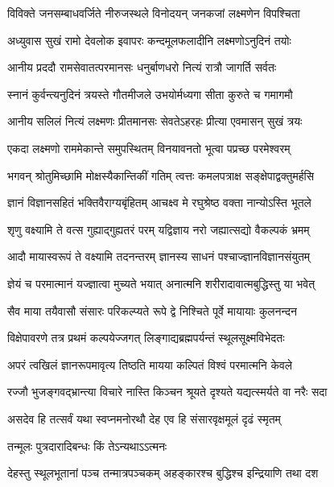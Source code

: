 \twolineshloka
{विविक्ते जनसम्बाधवर्जिते नीरुजस्थले}
{विनोदयन् जनकजां लक्ष्मणेन विपश्चिता} %

\twolineshloka
{अध्युवास सुखं रामो देवलोक इवापरः}
{कन्दमूलफलादीनि लक्ष्मणोऽनुदिनं तयोः} %

\twolineshloka
{आनीय प्रददौ रामसेवातत्परमानसः}
{धनुर्बाणधरो नित्यं रात्रौ जागर्ति सर्वतः} %

\twolineshloka
{स्नानं कुर्वन्त्यनुदिनं त्रयस्ते गौतमीजले}
{उभयोर्मध्यगा सीता कुरुते च गमागमौ} %

\twolineshloka
{आनीय सलिलं नित्यं लक्ष्मणः प्रीतमानसः}
{सेवतेऽहरहः प्रीत्या एवमासन् सुखं त्रयः} %

\twolineshloka
{एकदा लक्ष्मणो राममेकान्ते समुपस्थितम्}
{विनयावनतो भूत्वा पप्रच्छ परमेश्वरम्} %

\twolineshloka
{भगवन् श्रोतुमिच्छामि मोक्षस्यैकान्तिकीं गतिम्}
{त्वत्तः कमलपत्राक्ष सङ्क्षेपाद्वक्तुमर्हसि} %

\twolineshloka
{ज्ञानं विज्ञानसहितं भक्तिवैराग्यबृंहितम्}
{आचक्ष्व मे रघुश्रेष्ठ वक्ता नान्योऽस्ति भूतले} %


\twolineshloka
{शृणु वक्ष्यामि ते वत्स गुह्याद्गुह्यतरं परम्}
{यद्विज्ञाय नरो जह्यात्सद्यो वैकल्पकं भ्रमम्} %

\twolineshloka
{आदौ मायास्वरूपं ते वक्ष्यामि तदनन्तरम्}
{ज्ञानस्य साधनं पश्चाज्ज्ञानविज्ञानसंयुतम्} %

\twolineshloka
{ज्ञेयं च परमात्मानं यज्ज्ञात्वा मुच्यते भयात्}
{अनात्मनि शरीरादावात्मबुद्धिस्तु या भवेत्} %

\twolineshloka
{सैव माया तयैवासौ संसारः परिकल्प्यते}
{रूपे द्वे निश्चिते पूर्वे मायायाः कुलनन्दन} %

\twolineshloka
{विक्षेपावरणे तत्र प्रथमं कल्पयेज्जगत्}
{लिङ्गाद्यब्रह्मपर्यन्तं स्थूलसूक्ष्मविभेदतः} %

\twolineshloka
{अपरं त्वखिलं ज्ञानरूपमावृत्य तिष्ठति}
{मायया कल्पितं विश्वं परमात्मनि केवले} %

\twolineshloka
{रज्जौ भुजङ्गवद्भ्रान्त्या विचारे नास्ति किञ्चन}
{श्रूयते दृश्यते यद्यत्स्मर्यते वा नरैः सदा} %

\twolineshloka
{असदेव हि तत्सर्वं यथा स्वप्नमनोरथौ}
{देह एव हि संसारवृक्षमूलं दृढं स्मृतम्} %

\onelineshloka
{तन्मूलः पुत्रदारादिबन्धः किं तेऽन्यथाऽऽत्मनः} %


\twolineshloka
{देहस्तु स्थूलभूतानां पञ्च तन्मात्रपञ्चकम्}
{अहङ्कारश्च बुद्धिश्च इन्द्रियाणि तथा दश} %

